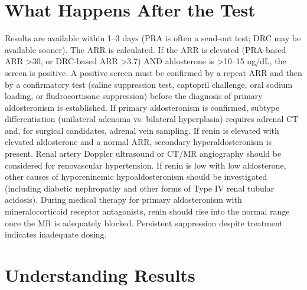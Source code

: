 \section*{What Happens After the Test}
Results are available within 1--3 days (PRA is often a send-out test; DRC may be available sooner). The ARR is calculated. If the ARR is elevated (PRA-based ARR >30, or DRC-based ARR >3.7) AND aldosterone is >10--15 ng/dL, the screen is positive. A positive screen must be confirmed by a repeat ARR and then by a confirmatory test (saline suppression test, captopril challenge, oral sodium loading, or fludrocortisone suppression) before the diagnosis of primary aldosteronism is established. If primary aldosteronism is confirmed, subtype differentiation (unilateral adenoma vs. bilateral hyperplasia) requires adrenal CT and, for surgical candidates, adrenal vein sampling. If renin is elevated with elevated aldosterone and a normal ARR, secondary hyperaldosteronism is present. Renal artery Doppler ultrasound or CT/MR angiography should be considered for renovascular hypertension. If renin is low with low aldosterone, other causes of hyporeninemic hypoaldosteronism should be investigated (including diabetic nephropathy and other forms of Type IV renal tubular acidosis). During medical therapy for primary aldosteronism with mineralocorticoid receptor antagonists, renin should rise into the normal range once the MR is adequately blocked. Persistent suppression despite treatment indicates inadequate dosing.

\section*{Understanding Results}

